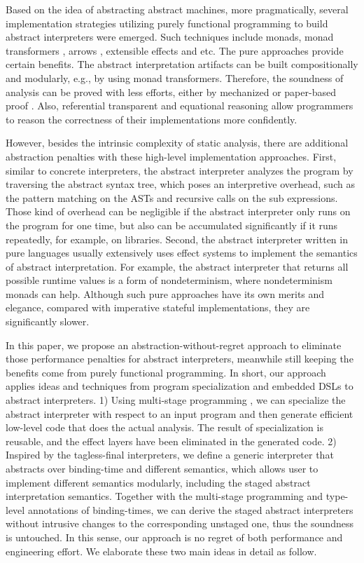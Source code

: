 Based on the idea of abstracting abstract machines, more
pragmatically, several implementation strategies utilizing purely
functional programming to build abstract interpreters were
emerged. Such techniques include monads, monad transformers
\cite{DBLP:journals/pacmpl/DaraisLNH17, Sergey:2013:MAI:2491956.2491979},
arrows \cite{Keidel:2018:CSP:3243631.3236767}, extensible effects
\cite{Githubsemantic} and etc.  The pure approaches provide certain
benefits. The abstract interpretation artifacts can be built
compositionally and modularly, e.g., by using monad
transformers. Therefore, the soundness of analysis can be proved with
less efforts, either by mechanized \cite{Darais:2016:CGC:2951913.2951934}
or paper-based proof \cite{Keidel:2018:CSP:3243631.3236767}. Also,
referential transparent and equational reasoning allow programmers to
reason the correctness of their implementations more confidently.

However, besides the intrinsic complexity of static analysis, there
are additional abstraction penalties with these high-level
implementation approaches.  First, similar to concrete interpreters,
the abstract interpreter analyzes the program by traversing the
abstract syntax tree, which poses an interpretive overhead, such as
the pattern matching on the ASTs and recursive calls on the sub
expressions. Those kind of overhead can be negligible if the abstract
interpreter only runs on the program for one time, but also can be
accumulated significantly if it runs repeatedly, for example, on
libraries.  Second, the abstract interpreter written in pure languages
usually extensively uses effect systems to implement the semantics of
abstract interpretation.  For example, the abstract interpreter that
returns all possible runtime values is a form of nondeterminism, where
nondeterminism monads can help.  Although such pure approaches have
its own merits and elegance, compared with imperative stateful
implementations, they are significantly slower.

In this paper, we propose an abstraction-without-regret approach to
eliminate those performance penalties for abstract interpreters,
meanwhile still keeping the benefits come from purely functional
programming.  In short, our approach applies ideas and techniques from
program specialization and embedded DSLs to abstract interpreters. 1)
Using multi-stage programming , we can specialize the abstract
interpreter with respect to an input program and then generate
efficient low-level code that does the actual analysis.  The result of
specialization is reusable, and the effect layers have been eliminated
in the generated code. 2) Inspired by the tagless-final interpreters,
we define a generic interpreter that abstracts over binding-time and
different semantics, which allows user to implement different
semantics modularly, including the staged abstract interpretation
semantics.  Together with the multi-stage programming and type-level
annotations of binding-times, we can derive the staged abstract
interpreters without intrusive changes to the corresponding unstaged
one, thus the soundness is untouched.  In this sense, our approach is
no regret of both performance and engineering effort. We elaborate
these two main ideas in detail as follow.

